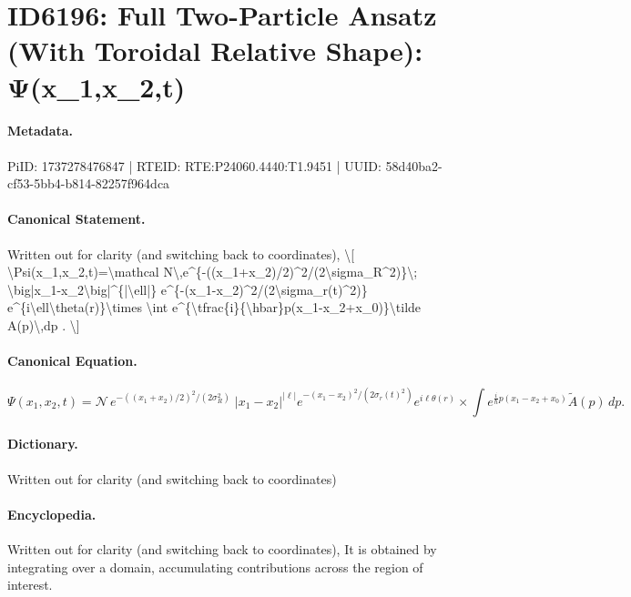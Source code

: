 \section*{ID6196: Full Two-Particle Ansatz (With Toroidal Relative Shape): Ψ(x\_1,x\_2,t)}
\paragraph{Metadata.}
PiID: 1737278476847 | RTEID: RTE:P24060.4440:T1.9451 | UUID: 58d40ba2-cf53-5bb4-b814-82257f964dca

\paragraph{Canonical Statement.}
Written out for clarity (and switching back to coordinates), \textbackslash{}[ \textbackslash{}Psi(x\_1,x\_2,t)=\textbackslash{}mathcal N\textbackslash{},e\textasciicircum{}\{-((x\_1+x\_2)/2)\textasciicircum{}2/(2\textbackslash{}sigma\_R\textasciicircum{}2)\}\textbackslash{}; \textbackslash{}big|x\_1-x\_2\textbackslash{}big|\textasciicircum{}\{|\textbackslash{}ell|\} e\textasciicircum{}\{-(x\_1-x\_2)\textasciicircum{}2/(2\textbackslash{}sigma\_r(t)\textasciicircum{}2)\} e\textasciicircum{}\{i\textbackslash{}ell\textbackslash{}theta(r)\}\textbackslash{}times \textbackslash{}int e\textasciicircum{}\{\textbackslash{}tfrac\{i\}\{\textbackslash{}hbar\}p(x\_1-x\_2+x\_0)\}\textbackslash{}tilde A(p)\textbackslash{},dp . \textbackslash{}]

\paragraph{Canonical Equation.}
\[
\Psi(x_1,x_2,t)=\mathcal N\,e^{-((x_1+x_2)/2)^2/(2\sigma_R^2)}\; \big|x_1-x_2\big|^{|\ell|} e^{-(x_1-x_2)^2/(2\sigma_r(t)^2)} e^{i\ell\theta(r)}\times \int e^{\tfrac{i}{\hbar}p(x_1-x_2+x_0)}\tilde A(p)\,dp .
\]

\paragraph{Dictionary.}
Written out for clarity (and switching back to coordinates)

\paragraph{Encyclopedia.}
Written out for clarity (and switching back to coordinates), It is obtained by integrating over a domain, accumulating contributions across the region of interest.
